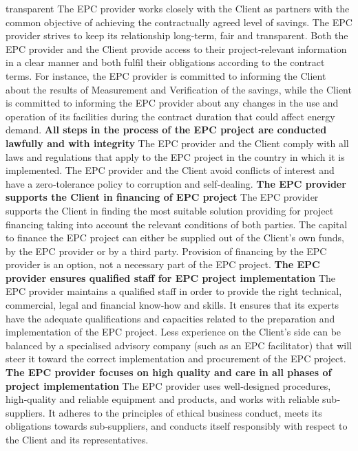 \begin{multicols}{2}
{transparent} 
The EPC provider works closely with the Client as partners with the common
objective of achieving the contractually agreed level of savings. The EPC
provider strives to keep its relationship long{‐}term, fair and transparent. 
Both the EPC provider and the Client provide access to their project{‐}relevant
information in a clear manner and both fulfil their obligations according to
the contract terms. For instance, the EPC provider is committed to informing
the Client about the results of Measurement and Verification of the savings,
while the Client is committed to informing the EPC provider about any changes
in the use and operation of its facilities during the contract duration that
could affect energy demand. 
\textbf{All steps in the process of the EPC project are conducted lawfully and with integrity} 
The EPC provider and the Client comply with all laws and regulations that apply
to the EPC project in the country in which it is implemented. The EPC provider
and the Client avoid conflicts of interest and have a zero{‐}tolerance policy to
corruption and self{‐}dealing. 
\textbf{The EPC provider supports the Client in financing of EPC project}
The EPC provider supports the Client in finding the most suitable solution
providing for project financing taking into account the relevant conditions of
both parties. The capital to finance the EPC project can either be supplied out
of the Client's own funds, by the EPC provider or by a third party. Provision
of financing by the EPC provider is an option, not a necessary part of the EPC
project. 
\textbf{The EPC provider ensures qualified staff for EPC project implementation} 
The EPC provider maintains a qualified staff in order to provide the right
technical, commercial, legal and financial know{‐}how and skills. It ensures that
its experts have the adequate qualifications and capacities related to the
preparation and implementation of the EPC project. Less experience on the
Client's side can be balanced by a specialised advisory company (such as an EPC
facilitator) that will steer it toward the correct implementation and
procurement of the EPC project. 
\textbf{The EPC provider focuses on high quality and care in all phases of project implementation} 
The EPC provider uses well{‐}designed procedures, high{‐}quality and reliable
equipment and products, and works with reliable sub{‐}suppliers. It adheres to
the principles of ethical business conduct, meets its obligations towards
sub{‐}suppliers, and conducts itself responsibly with respect to the Client and
its representatives. 

\end{multicols}
